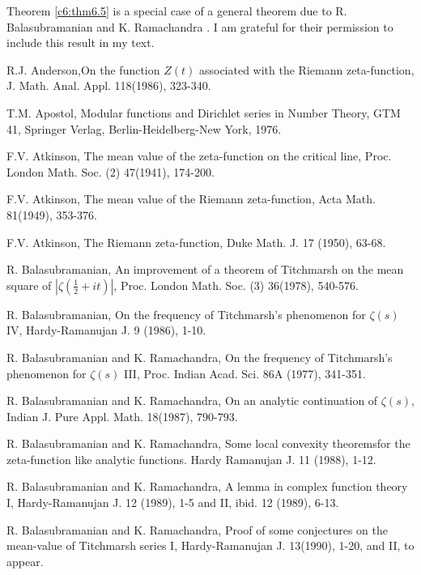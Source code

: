 Theorem \ref{c6:thm6.5} is a special case of a general theorem due to
R. Balasubramanian and K. Ramachandra \cite{Balasubramanian and
  Ramachandra5}. I am grateful for their permission to include this
result in my text. 

\begin{thebibliography}{99}
 R.J. Anderson,\pageoriginale On the function $Z(t)$ associated with the Riemann zeta-function, J. Math. Anal. Appl. 118(1986), 323-340.

 T.M. Apostol, Modular functions and Dirichlet series in Number Theory, GTM 41, Springer Verlag, Berlin-Heidelberg-New York, 1976.

 F.V. Atkinson, The mean value of the zeta-function on the critical line, Proc. London Math. Soc. (2) 47(1941), 174-200.

 F.V. Atkinson, The mean value of the Riemann zeta-function, Acta Math. 81(1949), 353-376.

 F.V. Atkinson, The Riemann zeta-function, Duke Math. J. 17 (1950), 63-68.

 R. Balasubramanian, An improvement of a theorem of Titchmarsh on the mean square of $|\zeta(\frac{1}{2} + it)|$, Proc. London Math. Soc. (3) 36(1978), 540-576.

 R. Balasubramanian, On the frequency of Titchmarsh's phenomenon for $\zeta(s)$ IV, Hardy-Ramanujan J. 9 (1986), 1-10.

 R. Balasubramanian and K. Ramachandra, On the frequency of Titchmarsh's phenomenon for $\zeta(s)$ III, Proc. Indian Acad. Sci. 86A (1977), 341-351.

 R. Balasubramanian and K. Ramachandra, On an analytic continuation of $\zeta(s)$, Indian J. Pure Appl. Math. 18(1987), 790-793.

 R. Balasubramanian and K. Ramachandra, Some local convexity theorems\pageoriginale for the zeta-function like analytic functions. Hardy Ramanujan J. 11 (1988), 1-12.

 R. Balasubramanian and K. Ramachandra, A lemma in complex function theory I, Hardy-Ramanujan J. 12 (1989), 1-5 and II, ibid. 12 (1989), 6-13.

  R. Balasubramanian and K. Ramachandra, Proof of some conjectures on the mean-value of Titchmarsh series I, Hardy-Ramanujan J. 13(1990), 1-20, and II, to appear.


\end{thebibliography}
